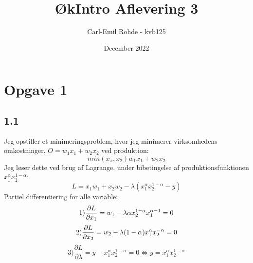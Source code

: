 \documentclass{article}
\begin{document}
\title{ØkIntro Aflevering 3}
\author{Carl-Emil Rohde - kvb125}
\date{December 2022}
\maketitle

\section*{Opgave 1}
\subsection*{1.1}
Jeg opstiller et minimeringsproblem, hvor jeg minimerer virksomhedens omkostninger, $O=w_1x_1+w_2x_2$ ved produktion:
\begin{equation}
    min(x_x,x_2) w_1x_1+w_2x_2
\end{equation}
Jeg løser dette ved brug af Lagrange, under bibetingelse af produktionsfunktionen $x_1^\alpha x_2^{1-\alpha}$: 
\begin{equation}
    L = x_1w_1+x_2w_2 - \lambda (x_1^\alpha x_2^{1-\alpha}- y)
\end{equation}
Partiel differentiering for alle variable:
\begin{equation}
    1) \frac{\partial L}{\partial x_1} = w_1-\lambda \alpha x_2^{1-\alpha} x_1^{\alpha-1}=0 \\
\end{equation}
\begin{equation}
    2) \frac{\partial L}{\partial x_2}=w_2-\lambda(1-\alpha) x_1^\alpha x_2^{-\alpha}=0 \\
\end{equation}
\begin{equation}
    3) \frac{\partial L}{\partial \lambda}=y-x_1^\alpha x_2^{1-\alpha}=0 \Leftrightarrow y=x_1^\alpha x_2^{1-\alpha}
\end{equation}
\end{document}
